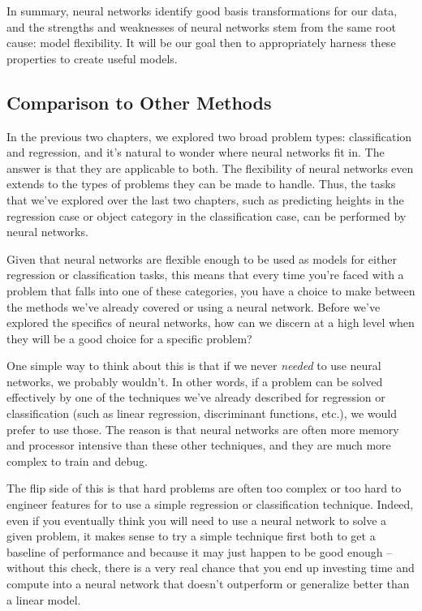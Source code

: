 In summary, neural networks identify good basis transformations for our data, and the strengths and weaknesses of neural networks stem from the same root cause: model flexibility. It will be our goal then to appropriately harness these properties to create useful models.

\subsection{Comparison to Other Methods}
In the previous two chapters, we explored two broad problem types: classification and regression, and it's natural to wonder where neural networks fit in. The answer is that they are applicable to both. The flexibility of neural networks even extends to the types of problems they can be made to handle. Thus, the tasks that we've explored over the last two chapters, such as predicting heights in the regression case or object category in the classification case, can be performed by neural networks.

Given that neural networks are flexible enough to be used as models for either regression or classification tasks, this means that every time you're faced with a problem that falls into one of these categories, you have a choice to make between the methods we've already covered or using a neural network. Before we've explored the specifics of neural networks, how can we discern at a high level when they will be a good choice for a specific problem?

One simple way to think about this is that if we never \textit{needed} to use neural networks, we probably wouldn't. In other words, if a problem can be solved effectively by one of the techniques we've already described for regression or classification (such as linear regression, discriminant functions, etc.), we would prefer to use those. The reason is that neural networks are often more memory and processor intensive than these other techniques, and they are much more complex to train and debug.

The flip side of this is that hard problems are often too complex or too hard to engineer features for to use a simple regression or classification technique. Indeed, even if you eventually think you will need to use a neural network to solve a given problem, it makes sense to try a simple technique first both to get a baseline of performance and because it may just happen to be good enough -- without this check, there is a very real chance that you end up investing time and compute into a neural network that doesn't outperform or generalize better than a linear model. 

